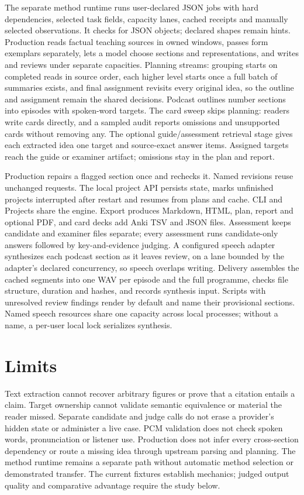 \documentclass[11pt,letterpaper]{article}
\begin{document}
The separate method runtime runs user-declared JSON jobs with hard dependencies, selected task fields, capacity lanes, cached receipts and manually selected observations. It checks for JSON objects; declared shapes remain hints. Production reads factual teaching sources in owned windows, passes form exemplars separately, lets a model choose sections and representations, and writes and reviews under separate capacities. Planning streams: grouping starts on completed reads in source order, each higher level starts once a full batch of summaries exists, and final assignment revisits every original idea, so the outline and assignment remain the shared decisions. Podcast outlines number sections into episodes with spoken-word targets. The card sweep skips planning: readers write cards directly, and a sampled audit reports omissions and unsupported cards without removing any. The optional guide/assessment retrieval stage gives each extracted idea one target and source-exact answer items. Assigned targets reach the guide or examiner artifact; omissions stay in the plan and report.

Production repairs a flagged section once and rechecks it. Named revisions reuse unchanged requests. The local project API persists state, marks unfinished projects interrupted after restart and resumes from plans and cache. CLI and Projects share the engine. Export produces Markdown, HTML, plan, report and optional PDF, and card decks add Anki TSV and JSON files. Assessment keeps candidate and examiner files separate; every assessment runs candidate-only answers followed by key-and-evidence judging. A configured speech adapter synthesizes each podcast section as it leaves review, on a lane bounded by the adapter's declared concurrency, so speech overlaps writing. Delivery assembles the cached segments into one WAV per episode and the full programme, checks file structure, duration and hashes, and records synthesis input. Scripts with unresolved review findings render by default and name their provisional sections. Named speech resources share one capacity across local processes; without a name, a per-user local lock serializes synthesis.

\section{Limits}
Text extraction cannot recover arbitrary figures or prove that a citation entails a claim. Target ownership cannot validate semantic equivalence or material the reader missed. Separate candidate and judge calls do not erase a provider's hidden state or administer a live case. PCM validation does not check spoken words, pronunciation or listener use. Production does not infer every cross-section dependency or route a missing idea through upstream parsing and planning. The method runtime remains a separate path without automatic method selection or demonstrated transfer. The current fixtures establish mechanics; judged output quality and comparative advantage require the study below.
\end{document}
